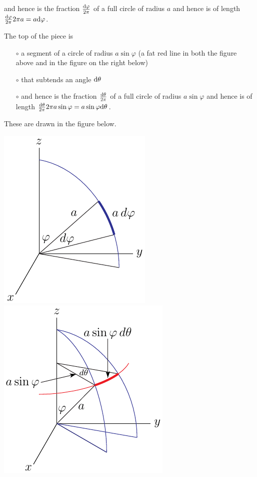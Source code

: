 \begin{eg}
\begin{itemize}
and hence is the fraction $\frac{\mathrm{d}\varphi}{2\pi}$ of a full circle
of radius $a$ and hence is of length 
$\frac{\mathrm{d}\varphi}{2\pi} 2\pi a = a\mathrm{d}\varphi$.
\end{itemize}
The top of the piece is
\begin{itemize}\itemsep1pt \parskip0pt  %
\item[$\circ$]
a segment of a circle of radius $a\sin\varphi$ (a fat red line in 
both the figure above and in the figure on the right below) 
\item[$\circ$]
that subtends an angle $\mathrm{d}\theta$
\item[$\circ$]
and hence is the fraction $\frac{\mathrm{d}\theta}{2\pi}$ of a full circle
of radius $a\sin\varphi$ and hence is of length 
$\frac{\mathrm{d}\theta}{2\pi} 2\pi a\sin\varphi = a\sin\varphi\mathrm{d}\theta$.
\end{itemize}
These are drawn in the figure below.
\begin{efig}
\begin{center}
    \includegraphics{sphericaldSB.pdf}\qquad
    \includegraphics{sphericaldSC.pdf}

\end{center}
\end{efig}
\end{eg}
